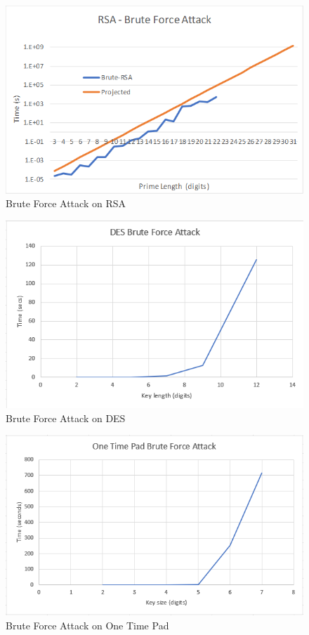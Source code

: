 \documentclass[12pt]{report}
\begin{document}
\begin{figure}[hp!] %
    \begin{center}
        \includegraphics[width=0.85\linewidth]{RSABrute.PNG}
        \caption{Brute Force Attack on RSA}
        \label{fig:rsa1}
    \end{center}
\end{figure}

\begin{figure}[hp!] %
    \begin{center}
        \includegraphics[width=0.85\linewidth]{DESBruteForce.png}
        \caption{Brute Force Attack on DES}
        \label{fig:DESBruteForce}
    \end{center}
\end{figure}

\begin{figure}[hp!] %
    \begin{center}
        \includegraphics[width=0.85\linewidth]{OTPBruteForce.png}
        \caption{Brute Force Attack on One Time Pad}
        \label{fig:OTPBruteForce}
    \end{center}
\end{figure}
\end{document}
